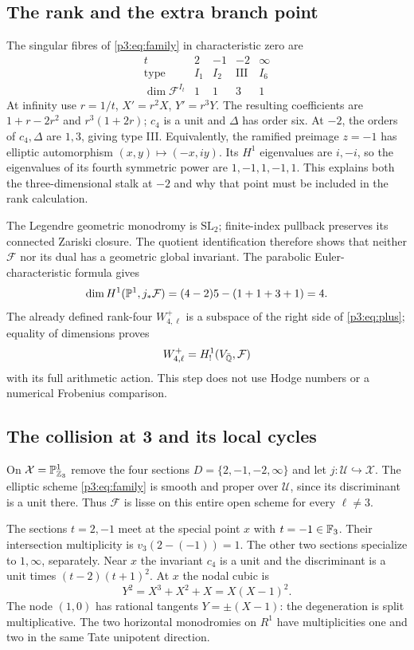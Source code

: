 \subsection{The rank and the extra branch point}
The singular fibres of \eqref{p3:eq:family} in characteristic zero are
\[
\begin{array}{c|rrrr}
 t&2&-1&-2&\infty\\\hline
 \text{type}&I_1&I_2&\mathrm{III}&I_6\\
 \dim\mathcal F^{I_t}&1&1&3&1
\end{array}
\]
At infinity use $r=1/t$, $X'=r^2X$, $Y'=r^3Y$. The resulting coefficients
are $1+r-2r^2$ and $r^3(1+2r)$; $c_4$ is a unit and $\Delta$ has order six.
At $-2$, the orders of $c_4,\Delta$ are $1,3$, giving type III.
Equivalently, the ramified preimage $z=-1$ has elliptic automorphism
$(x,y)\mapsto(-x,iy)$. Its $H^1$ eigenvalues are $i,-i$, so the eigenvalues
of its fourth symmetric power are $1,-1,1,-1,1$.
This explains both the three-dimensional stalk at $-2$ and why that point
must be included in the rank calculation.

The Legendre geometric monodromy is $\mathrm{SL}_2$; finite-index pullback
preserves its connected Zariski closure. The quotient identification therefore
shows that neither $\mathcal F$ nor its dual has a geometric global invariant.
The parabolic Euler-characteristic formula gives
\[
 \dim H^1(\mathbb P^1,j_*\mathcal F)=(4-2)5-(1+1+3+1)=4.
\]
The already defined rank-four $W_{4,\ell}^{+}$ is a subspace of the right
side of \eqref{p3:eq:plus}; equality of dimensions proves
\begin{equation}\label{p3:eq:identification}
 W_{4,\ell}^{+}=H^1_!(V_{\bar{\mathbb Q}},\mathcal F)
\end{equation}
with its full arithmetic action. This step does not use Hodge numbers or a
numerical Frobenius comparison.

\subsection{The collision at 3 and its local cycles}
On $\mathcal X=\mathbb P^1_{\mathbb Z_3}$ remove the four sections
$D=\{2,-1,-2,\infty\}$ and let $j:\mathcal U\hookrightarrow\mathcal X$.
The elliptic scheme \eqref{p3:eq:family} is smooth and proper over $\mathcal U$,
since its discriminant is a unit there. Thus $\mathcal F$ is lisse on this
entire open scheme for every $\ell\ne3$.

The sections $t=2,-1$ meet at the special point $x$ with $t=-1\in\mathbb F_3$.
Their intersection multiplicity is $v_3(2-(-1))=1$. The other two sections
specialize to $1,\infty$, separately. Near $x$ the invariant $c_4$ is a unit
and the discriminant is a unit times $(t-2)(t+1)^2$.
At $x$ the nodal cubic is
\[
 Y^2=X^3+X^2+X=X(X-1)^2.
\]
The node $(1,0)$ has rational tangents $Y=\pm(X-1)$: the degeneration is
split multiplicative. The two horizontal monodromies on $R^1$ have
multiplicities one and two in the same Tate unipotent direction.


